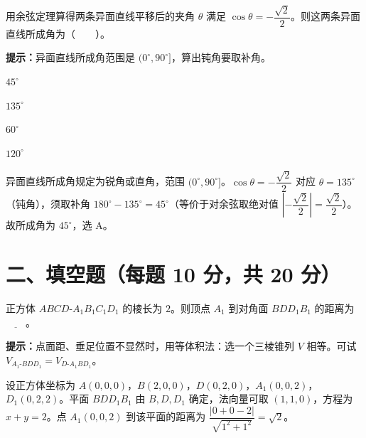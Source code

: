 \documentclass{exam-zh}
\begin{document}
\begin{question}[points=8]
  用余弦定理算得两条异面直线平移后的夹角 $\theta$ 满足 $\cos\theta=-\dfrac{\sqrt2}{2}$。则这两条异面直线所成角为（　　）。
  \begin{hintbox}
\textbf{提示：}异面直线所成角范围是 $(0^\circ,90^\circ]$，算出钝角要取补角。\end{hintbox}

  \begin{choices}
    \item $45^\circ$
    \item $135^\circ$
    \item $60^\circ$
    \item $120^\circ$
  \end{choices}
  \paren[A]
  \begin{solutionblock}
    异面直线所成角规定为锐角或直角，范围 $(0^\circ,90^\circ]$。$\cos\theta=-\dfrac{\sqrt2}{2}$ 对应 $\theta=135^\circ$（钝角），须取补角 $180^\circ-135^\circ=45^\circ$（等价于对余弦取绝对值 $\left|-\dfrac{\sqrt2}{2}\right|=\dfrac{\sqrt2}{2}$）。故所成角为 $45^\circ$，选 A。
  \end{solutionblock}
\end{question}


\section*{二、填空题（每题 10 分，共 20 分）}


\begin{question}[points=10]
  \noindent
  \begin{minipage}[t]{\dimexpr\linewidth-70mm-6mm\relax}
    \vspace{0pt}
    正方体 $ABCD\text{-}A_1B_1C_1D_1$ 的棱长为 $2$。则顶点 $A_1$ 到对角面 $BDD_1B_1$ 的距离为 $\underline{\hspace{2em}}$。
    \begin{hintbox}
\textbf{提示：}点面距、垂足位置不显然时，用等体积法：选一个三棱锥列 $V$ 相等。可试 $V_{A_1\text{-}BDD_1}=V_{D\text{-}A_1BD_1}$。\end{hintbox}

  \end{minipage}\hfill
  \begin{diagramcoltikz}{70mm}{正方体，标出 $A_1$ 与对角面 $BDD_1B_1$。}
  }
  \end{diagramcoltikz}
  \paren[$\sqrt{2}$]
  \begin{solutionblock}
    设正方体坐标为 $A(0,0,0)$，$B(2,0,0)$，$D(0,2,0)$，$A_1(0,0,2)$，$D_1(0,2,2)$。平面 $BDD_1B_1$ 由 $B,D,D_1$ 确定，法向量可取 $(1,1,0)$，方程为 $x+y=2$。点 $A_1(0,0,2)$ 到该平面的距离为 $\dfrac{|0+0-2|}{\sqrt{1^2+1^2}}=\sqrt2$。
  \end{solutionblock}
\end{question}
\end{document}
